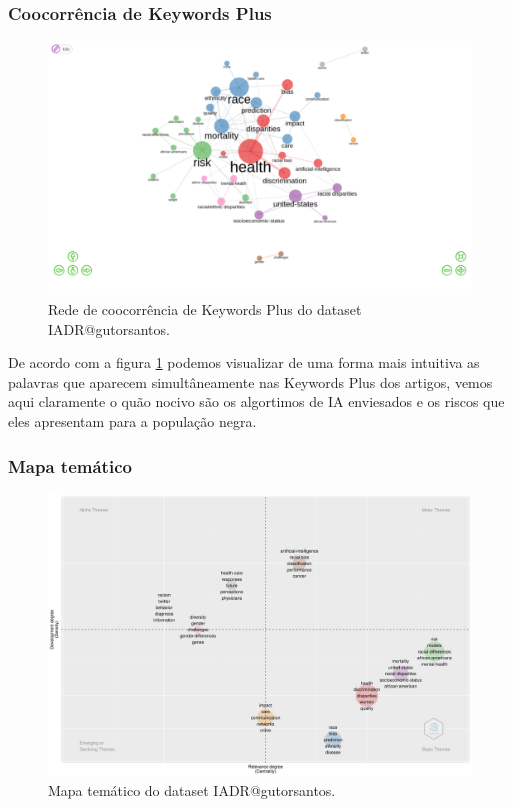 \subsubsection{Coocorrência de Keywords Plus}

\begin{figure}
    \centering
\includegraphics[angle=0,width=1\textwidth]{experiments/gutorsantos/AnaliseBibliometrica/IAeDiscriminacao/imgs/CoOccurrence.png}
    \caption{Rede de coocorrência de Keywords Plus do dataset IADR@gutorsantos.}
    \label{fig:IADR@gutorsantos:CoOcorrenceKW}
\end{figure}

De acordo com a figura \ref{fig:IADR@gutorsantos:CoOcorrenceKW} podemos visualizar de uma forma mais intuitiva as palavras que aparecem simultâneamente nas Keywords Plus dos artigos, vemos aqui claramente o quão nocivo são os algortimos de IA enviesados e os riscos que eles apresentam para a população negra.

\subsubsection{Mapa temático}
\begin{figure}[H]
    \centering
\includegraphics[angle=0,width=1\textwidth]{experiments/gutorsantos/AnaliseBibliometrica/IAeDiscriminacao/imgs/ThematicMap-2022-02-09.png}
    \caption{Mapa temático do dataset IADR@gutorsantos.}
    \label{fig:IADR@gutorsantos:ThematicMap}
\end{figure}



